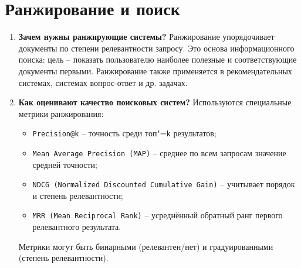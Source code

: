 \documentclass{article}
\begin{document}
\section{Ранжирование и поиск}
\begin{enumerate}
    \item \textbf{Зачем нужны ранжирующие системы?} Ранжирование упорядочивает документы по степени релевантности запросу. Это основа информационного поиска: цель -- показать пользователю наиболее полезные и соответствующие документы первыми.
    Ранжирование также применяется в рекомендательных системах, системах вопрос-ответ и др. задачах.
    \item\textbf{Как оценивают качество поисковых систем?} Используются специальные метрики ранжирования:
    \begin{itemize}
        \item \texttt{Precision@k} -- точность среди топ"=\texttt{k} результатов;
        \item \texttt{Mean Average Precision (MAP)} -- среднее по всем запросам значение средней точности;
        \item \texttt{NDCG (Normalized Discounted Cumulative Gain)} -- учитывает порядок и степень релевантности;
        \item \texttt{MRR (Mean Reciprocal Rank)} -- усреднённый обратный ранг первого релевантного результата.
    \end{itemize}
    Метрики могут быть бинарными (релевантен/нет) и градуированными (степень релевантности).
\end{enumerate}
\end{document}
